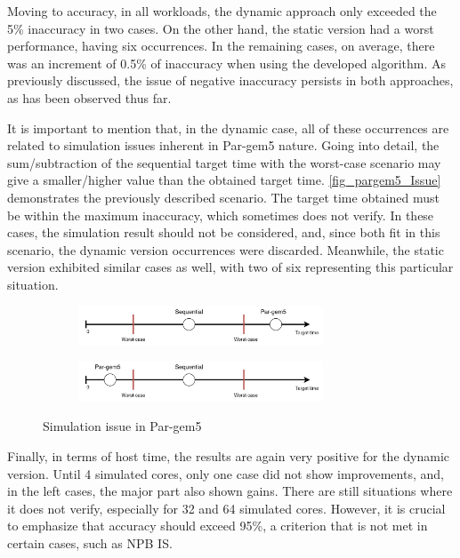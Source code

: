 Moving to accuracy, in all workloads, the dynamic approach only exceeded the 5\% inaccuracy in two cases. On the other hand, the static 
version had a worst performance, having six occurrences. In the remaining cases, on average, there was an increment of 0.5\% of inaccuracy when 
using the developed algorithm. As previously discussed, the issue of negative inaccuracy persists in both approaches, as has been observed thus far.

It is important to mention that, in the dynamic case, all of these occurrences are related to 
simulation issues inherent in Par-gem5 nature. Going into detail, the sum/subtraction of the sequential target time with the 
worst-case scenario may give a smaller/higher value than the obtained target time. \autoref{fig_pargem5_Issue} demonstrates the previously described 
scenario. The target time obtained must be within the maximum inaccuracy, which sometimes does not verify. In these cases, the simulation result 
should not be considered, and, since both fit in this scenario, the dynamic version occurrences were discarded. Meanwhile, the static 
version exhibited similar cases as well, with two of six representing this particular situation. 

\begin{figure}[H]
    \centering
    \begin{subfigure}{\textwidth}
        \centering
        \includegraphics[width=0.8\textwidth]{Images/pargem5_Issue1.png}
    \end{subfigure}
    \begin{subfigure}{\textwidth}
        \centering
        \includegraphics[width=0.8\textwidth]{Images/pargem5_Issue2.png}
    \end{subfigure}

    \caption{Simulation issue in Par-gem5}
	\label{fig_pargem5_Issue}
\end{figure}

Finally, in terms of host time, the results are again very positive for the dynamic version. Until 4 simulated cores, only one case did not 
show improvements, and, in the left cases, the major part also shown gains. There are still situations where it does not verify, 
especially for 32 and 64 simulated cores. However, it is crucial to emphasize that accuracy should exceed 95\%, a criterion that is 
not met in certain cases, such as NPB IS.




